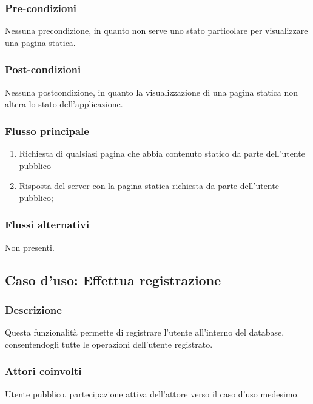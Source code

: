 	\subsubsection*{Pre-condizioni}
	Nessuna precondizione, in quanto non serve uno stato particolare per visualizzare una pagina statica.
	
	\subsubsection*{Post-condizioni}
	Nessuna postcondizione, in quanto la visualizzazione di una pagina statica non altera lo stato dell'applicazione.
	
	\subsubsection*{Flusso principale}
	
	\begin{enumerate}
		
		\item
		Richiesta di qualsiasi pagina che abbia contenuto statico da parte dell'utente pubblico
		
		\item
		Risposta del server con la pagina statica richiesta da parte dell'utente pubblico;
		
	\end{enumerate}
	
	\subsubsection*{Flussi alternativi}
	Non presenti.

%
%
\subsection{Caso d'uso: Effettua registrazione}

	\subsubsection*{Descrizione}
	Questa funzionalità permette di registrare l'utente all'interno del database, consentendogli tutte le operazioni dell'utente registrato.
	
	\subsubsection*{Attori coinvolti}
	Utente pubblico, partecipazione attiva dell'attore verso il caso d'uso medesimo.
	
